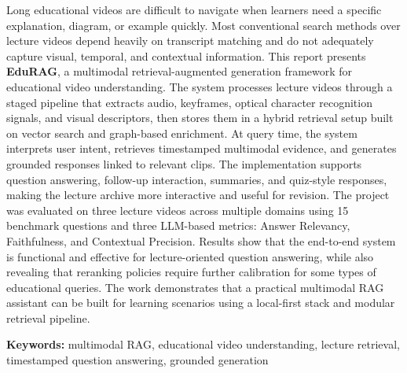 \documentclass[12pt,a4paper,oneside]{report}
\begin{document}
Long educational videos are difficult to navigate when learners need a specific explanation, diagram, or example quickly. Most conventional search methods over lecture videos depend heavily on transcript matching and do not adequately capture visual, temporal, and contextual information. This report presents \textbf{EduRAG}, a multimodal retrieval-augmented generation framework for educational video understanding. The system processes lecture videos through a staged pipeline that extracts audio, keyframes, optical character recognition signals, and visual descriptors, then stores them in a hybrid retrieval setup built on vector search and graph-based enrichment. At query time, the system interprets user intent, retrieves timestamped multimodal evidence, and generates grounded responses linked to relevant clips. The implementation supports question answering, follow-up interaction, summaries, and quiz-style responses, making the lecture archive more interactive and useful for revision. The project was evaluated on three lecture videos across multiple domains using 15 benchmark questions and three LLM-based metrics: Answer Relevancy, Faithfulness, and Contextual Precision. Results show that the end-to-end system is functional and effective for lecture-oriented question answering, while also revealing that reranking policies require further calibration for some types of educational queries. The work demonstrates that a practical multimodal RAG assistant can be built for learning scenarios using a local-first stack and modular retrieval pipeline.

\vspace{0.8cm}
\noindent\textbf{Keywords:} multimodal RAG, educational video understanding, lecture retrieval, timestamped question answering, grounded generation

\clearpage
{}
\tableofcontents
\clearpage
\listoffigures
\clearpage
\listoftables

\clearpage
\end{document}
